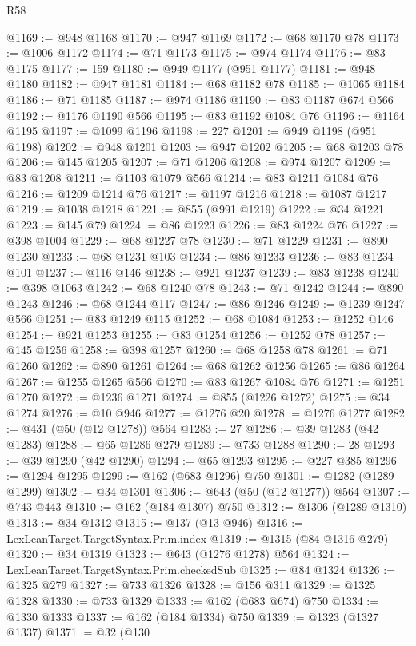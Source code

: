 \begin{lexlean}{R58}
\begin{coremodule}
{{@1169 := @948 @1168
@1170 := @947 @1169
@1172 := @68 @1170 @78
@1173 := @1006 @1172
@1174 := @71 @1173
@1175 := @974 @1174
@1176 := @83 @1175
@1177 := 159
@1180 := @949 @1177 (@951 @1177)
@1181 := @948 @1180
@1182 := @947 @1181
@1184 := @68 @1182 @78
@1185 := @1065 @1184
@1186 := @71 @1185
@1187 := @974 @1186
@1190 := @83 @1187 @674 @566
@1192 := @1176 @1190 @566
@1195 := @83 @1192 @1084 @76
@1196 := @1164 @1195
@1197 := @1099 @1196
@1198 := 227
@1201 := @949 @1198 (@951 @1198)
@1202 := @948 @1201
@1203 := @947 @1202
@1205 := @68 @1203 @78
@1206 := @145 @1205
@1207 := @71 @1206
@1208 := @974 @1207
@1209 := @83 @1208
@1211 := @1103 @1079 @566
@1214 := @83 @1211 @1084 @76
@1216 := @1209 @1214 @76
@1217 := @1197 @1216
@1218 := @1087 @1217
@1219 := @1038 @1218
@1221 := @855 (@991 @1219)
@1222 := @34 @1221
@1223 := @145 @79
@1224 := @86 @1223
@1226 := @83 @1224 @76
@1227 := @398 @1004
@1229 := @68 @1227 @78
@1230 := @71 @1229
@1231 := @890 @1230
@1233 := @68 @1231 @103
@1234 := @86 @1233
@1236 := @83 @1234 @101
@1237 := @116 @146
@1238 := @921 @1237
@1239 := @83 @1238
@1240 := @398 @1063
@1242 := @68 @1240 @78
@1243 := @71 @1242
@1244 := @890 @1243
@1246 := @68 @1244 @117
@1247 := @86 @1246
@1249 := @1239 @1247 @566
@1251 := @83 @1249 @115
@1252 := @68 @1084
@1253 := @1252 @146
@1254 := @921 @1253
@1255 := @83 @1254
@1256 := @1252 @78
@1257 := @145 @1256
@1258 := @398 @1257
@1260 := @68 @1258 @78
@1261 := @71 @1260
@1262 := @890 @1261
@1264 := @68 @1262 @1256
@1265 := @86 @1264
@1267 := @1255 @1265 @566
@1270 := @83 @1267 @1084 @76
@1271 := @1251 @1270
@1272 := @1236 @1271
@1274 := @855 (@1226 @1272)
@1275 := @34 @1274
@1276 := @10 @946
@1277 := @1276 @20
@1278 := @1276 @1277
@1282 := @431 (@50 (@12 @1278)) @564
@1283 := 27
@1286 := @39 @1283 (@42 @1283)
@1288 := @65 @1286 @279
@1289 := @733 @1288
@1290 := 28
@1293 := @39 @1290 (@42 @1290)
@1294 := @65 @1293
@1295 := @227 @385
@1296 := @1294 @1295
@1299 := @162 (@683 @1296) @750
@1301 := @1282 (@1289 @1299)
@1302 := @34 @1301
@1306 := @643 (@50 (@12 @1277)) @564
@1307 := @743 @443
@1310 := @162 (@184 @1307) @750
@1312 := @1306 (@1289 @1310)
@1313 := @34 @1312
@1315 := @137 (@13 @946)
@1316 := LexLeanTarget.TargetSyntax.Prim.index
@1319 := @1315 (@84 @1316 @279)
@1320 := @34 @1319
@1323 := @643 (@1276 @1278) @564
@1324 := LexLeanTarget.TargetSyntax.Prim.checkedSub
@1325 := @84 @1324
@1326 := @1325 @279
@1327 := @733 @1326
@1328 := @156 @311
@1329 := @1325 @1328
@1330 := @733 @1329
@1333 := @162 (@683 @674) @750
@1334 := @1330 @1333
@1337 := @162 (@184 @1334) @750
@1339 := @1323 (@1327 @1337)
@1371 := @32
    (@130
}}
\end{coremodule}
\end{lexlean}
